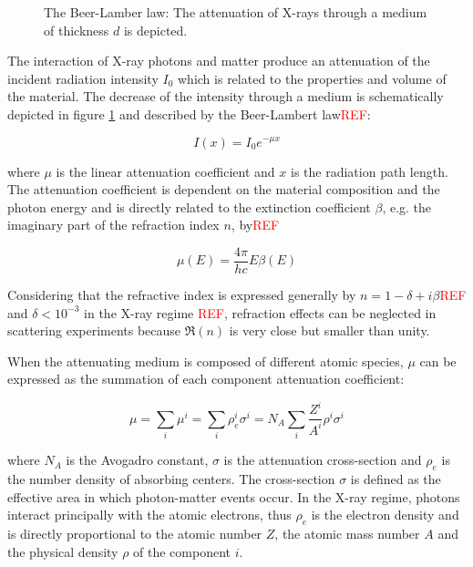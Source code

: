 \begin{figure}%
	\centering
	        \def\svgwidth{0.75\linewidth}
		
		\caption{The Beer-Lamber law: The attenuation of X-rays through a medium of thickness $d$ is depicted.}
		\label{fig:BeerLambertScheme}
\end{figure}

The interaction of X-ray photons and matter produce an attenuation of the incident radiation intensity $I_0$ which is related to the properties and volume of the material. The decrease of the intensity through a medium is schematically depicted in figure \ref{fig:BeerLambertScheme} and described by the Beer-Lambert law\textcolor{red}{REF}:

\begin{equation}
        I\left( x \right)=I_0e^{-\mu x}
\end{equation}

where $\mu$ is the linear attenuation coefficient and $x$ is the radiation path length. The attenuation coefficient is dependent on the material composition and the photon energy and is directly related to the extinction coefficient $\beta$, e.g. the imaginary part of the refraction index $n$, by\textcolor{red}{REF} 

\begin{equation}
        \mu (E) = \frac{4\pi}{hc} E \beta(E)
\end{equation}

Considering that the refractive index is expressed generally by $n = 1 - \delta +i \beta$\textcolor{red}{REF} and $\delta<10^{-3}$ in the X-ray regime \textcolor{red}{REF}, refraction effects can be neglected in scattering experiments because $\Re(n)$ is very close but smaller than unity.

When the attenuating medium is composed of different atomic species, $\mu$ can be expressed as the summation of each component attenuation coefficient:

\begin{equation}
        \mu = \sum_i \mu^i = \sum_i \rho_e^i \sigma^i  =N_A\sum_i  \frac{Z^i}{A^i} \rho^i \sigma^i
\end{equation}

where $N_A$ is the Avogadro constant, $\sigma$ is the attenuation cross-section and $\rho_e$ is the number density of absorbing centers. The cross-section $\sigma$ is defined as the effective area in which photon-matter events occur. In the X-ray regime, photons interact principally with the atomic electrons, thus $\rho_e$ is the electron density and is directly proportional to the atomic number $Z$, the atomic mass number $A$ and the physical density $\rho$ of the component $i$. 

